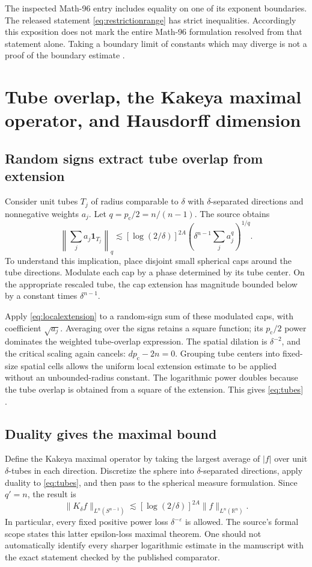 \documentclass[11pt,a4paper]{article}
\numberwithin{equation}{section}
\theoremstyle{definition}
\theoremstyle{remark}
\newcommand{\R}{\mathbb R}
\newcommand{\eps}{\varepsilon}
\newcommand{\pc}{p_{\mathrm c}}
\newcommand{\one}{\mathbf 1}
\begin{document}
The inspected Math-96 entry includes equality on one of its exponent boundaries.
The released statement \eqref{eq:restrictionrange} has strict inequalities.
Accordingly this exposition does not mark the entire Math-96 formulation
resolved from that statement alone. Taking a boundary limit of constants which
may diverge is not a proof of the boundary estimate \cite{restriction-catalogue}.

\section{Tube overlap, the Kakeya maximal operator, and Hausdorff dimension}
\label{sec:kakeya}
\subsection{Random signs extract tube overlap from extension}
Consider unit tubes $T_j$ of radius comparable to $\delta$ with
$\delta$-separated directions and nonnegative weights $a_j$.
Let $q=\pc/2=n/(n-1)$. The source obtains
\begin{equation}\label{eq:tubes}
 \left\|\sum_j a_j\one_{T_j}\right\|_q
 \lesssim[\log(2/\delta)]^{2A}
          \left(\delta^{n-1}\sum_j a_j^q\right)^{1/q}.
\end{equation}
To understand this implication, place disjoint small spherical caps around
the tube directions. Modulate each cap by a phase determined by its tube
center. On the appropriate rescaled tube, the cap extension has magnitude
bounded below by a constant times $\delta^{n-1}$.

Apply \eqref{eq:localextension} to a random-sign sum of these modulated caps,
with coefficient $\sqrt{a_j}$. Averaging over the signs retains a square
function; its $\pc/2$ power dominates the weighted tube-overlap expression.
The spatial dilation is $\delta^{-2}$, and the critical scaling again cancels:
$d\pc-2n=0$. Grouping tube centers into fixed-size spatial cells allows the
uniform local extension estimate to be applied without an unbounded-radius
constant. The logarithmic power doubles because the tube overlap is obtained
from a square of the extension. This gives \eqref{eq:tubes}
\cite{kakeya-proof}.

\subsection{Duality gives the maximal bound}
Define the Kakeya maximal operator by taking the largest average of $|f|$
over unit $\delta$-tubes in each direction. Discretize the sphere into
$\delta$-separated directions, apply duality to \eqref{eq:tubes}, and then
pass to the spherical measure formulation. Since $q'=n$, the result is
\begin{equation}\label{eq:kmax}
 \|K_\delta f\|_{L^n(S^{n-1})}
 \lesssim [\log(2/\delta)]^{2A}\|f\|_{L^n(\R^n)}.
\end{equation}
In particular, every fixed positive power loss $\delta^{-\eps}$ is allowed.
The source's formal scope states this latter epsilon-loss maximal theorem.
One should not automatically identify every sharper logarithmic estimate in
the manuscript with the exact statement checked by the published comparator.
\end{document}
